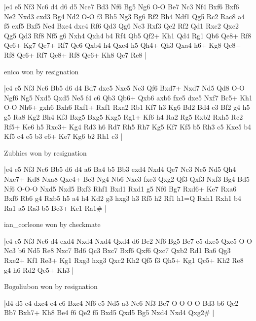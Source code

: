 \makegametitle
|e4 e5 Nf3 Nc6 d4 d6 d5 Nce7 Bd3 Nf6 Bg5 Ng6 O-O Be7 Nc3 Nf4 Bxf6 Bxf6 Ne2 Nxd3 cxd3 Bg4 Nd2 O-O f3 Bh5 Ng3 Bg6 Rf2 Bh4 Ndf1 Qg5 Rc2 Rac8 a4 f5 exf5 Bxf5 Ne4 Bxe4 dxe4 Rf6 Qd3 Qg6 Ne3 Rxf3 Qe2 Rf2 Qd1 Rxc2 Qxc2 Qg5 Qd3 Rf8 Nf5 g6 Nxh4 Qxh4 b4 Rf4 Qb5 Qf2+ Kh1 Qd4 Rg1 Qb6 Qe8+ Rf8 Qe6+ Kg7 Qe7+ Rf7 Qe6 Qxb4 h4 Qxe4 h5 Qh4+ Qh3 Qxa4 h6+ Kg8 Qc8+ Rf8 Qe6+ Rf7 Qe8+ Rf8 Qe6+ Kh8 Qe7 Re8  |

\showboard

enico won by resignation

\makegametitle
|e4 e5 Nf3 Nc6 Bb5 d6 d4 Bd7 dxe5 Nxe5 Nc3 Qf6 Bxd7+ Nxd7 Nd5 Qd8 O-O Ngf6 Ng5 Nxd5 Qxd5 Ne5 f4 c6 Qb3 Qb6+ Qxb6 axb6 fxe5 dxe5 Nxf7 Bc5+ Kh1 O-O Nh6+ gxh6 Bxh6 Rxf1+ Rxf1 Rxa2 Rb1 Kf7 h3 Kg6 Bd2 Bd4 c3 Bf2 g4 h5 g5 Ra8 Kg2 Bh4 Kf3 Bxg5 Bxg5 Kxg5 Rg1+ Kf6 h4 Ra2 Rg5 Rxb2 Rxh5 Rc2 Rf5+ Ke6 h5 Rxc3+ Kg4 Rd3 h6 Rd7 Rh5 Rh7 Kg5 Kf7 Kf5 b5 Rh3 c5 Kxe5 b4 Kf5 c4 e5 b3 e6+ Ke7 Kg6 b2 Rh1 c3  |

\showboard

Zubhies won by resignation

\makegametitle
|e4 e5 Nf3 Nc6 Bb5 d6 d4 a6 Ba4 b5 Bb3 exd4 Nxd4 Qe7 Nc3 Ne5 Nd5 Qh4 Nxc7+ Kd8 Nxa8 Qxe4+ Be3 Ng4 Nb6 Nxe3 fxe3 Qxg2 Qf3 Qxf3 Nxf3 Bg4 Bd5 Nf6 O-O-O Nxd5 Nxd5 Bxf3 Rhf1 Bxd1 Rxd1 g5 Nf6 Bg7 Rxd6+ Ke7 Rxa6 Bxf6 Rb6 g4 Rxb5 h5 a4 h4 Kd2 g3 hxg3 h3 Rf5 h2 Rf1 h1=Q Rxh1 Rxh1 b4 Ra1 a5 Ra3 b5 Bc3+ Kc1 Ra1\#  |

\showboard

ian\_corleone won by checkmate

\makegametitle
|e4 e5 Nf3 Nc6 d4 exd4 Nxd4 Nxd4 Qxd4 d6 Be2 Nf6 Bg5 Be7 e5 dxe5 Qxe5 O-O Nc3 b6 Nd5 Re8 Nxc7 Bd6 Qc3 Bxc7 Bxf6 Qxf6 Qxc7 Qxb2 Rd1 Ba6 Qg3 Rxe2+ Kf1 Re3+ Kg1 Rxg3 hxg3 Qxc2 Kh2 Qf5 f3 Qh5+ Kg1 Qc5+ Kh2 Re8 g4 h6 Rd2 Qe5+ Kh3  |

\showboard

Bogoliubon won by resignation

\makegametitle
|d4 d5 c4 dxc4 e4 e6 Bxc4 Nf6 e5 Nd5 a3 Nc6 Nf3 Be7 O-O O-O Bd3 b6 Qc2 Bb7 Bxh7+ Kh8 Be4 f6 Qe2 f5 Bxd5 Qxd5 Bg5 Nxd4 Nxd4 Qxg2\#  |

